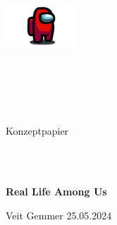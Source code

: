 \author{Veit Gemmer}
\date{\today}
\begin{center}
\includegraphics[height=1.5cm]{graphics/among_us.png}
\end{center}
\begin{verbatim}





\end{verbatim}
\begin{center}
    \Large{Konzeptpapier}
\end{center}
\begin{verbatim}



\end{verbatim}
\begin{center}
    \textbf{\Large{Real Life Among Us}}
\end{center}
\vfill
\begin{center}
    Veit Gemmer
    25.05.2024
    \begin{verbatim}



    \end{verbatim}
\end{center}
